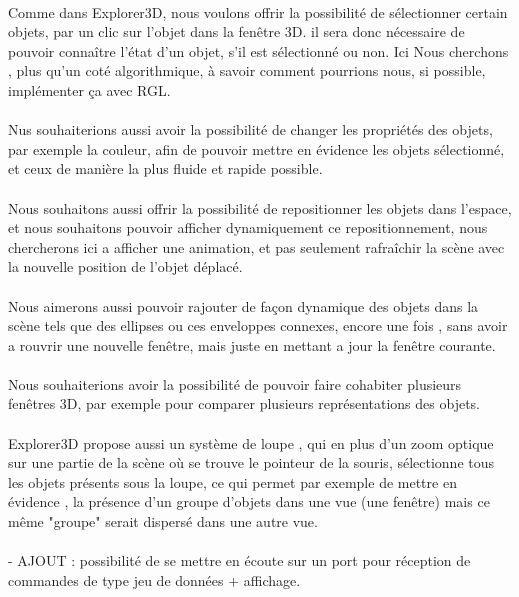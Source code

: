 \paragraph{}
Comme dans Explorer3D, nous voulons offrir la possibilité de sélectionner certain objets, par un clic sur l'objet dans la fenêtre 3D. il sera donc nécessaire de pouvoir connaître l'état d'un objet, s’il est sélectionné ou non. Ici Nous cherchons , plus qu'un coté algorithmique, à savoir comment pourrions nous, si possible, implémenter ça avec RGL.

\paragraph{}
Nus souhaiterions aussi avoir la possibilité de changer les propriétés des objets, par exemple la couleur, afin de pouvoir mettre en évidence les objets sélectionné, et ceux de manière la plus fluide et rapide possible.

\paragraph{}
Nous souhaitons aussi offrir la possibilité de repositionner les objets dans l'espace, et nous souhaitons pouvoir afficher dynamiquement ce repositionnement, nous chercherons ici a afficher une animation, et pas seulement rafraîchir la scène avec la nouvelle position de l'objet déplacé. 

\paragraph{}
Nous aimerons aussi pouvoir rajouter de façon dynamique des objets dans la scène tels que des ellipses ou ces enveloppes connexes, encore une fois , sans avoir a rouvrir une nouvelle fenêtre, mais juste en mettant a jour la fenêtre courante.

\paragraph{}
Nous souhaiterions avoir la possibilité de pouvoir faire cohabiter plusieurs fenêtres 3D,  par exemple pour comparer plusieurs représentations des objets.

\paragraph{}
Explorer3D propose aussi un système de loupe , qui en plus d'un zoom optique sur une partie de la scène où se trouve le pointeur de la souris, sélectionne tous les objets présents sous la loupe, ce qui permet par exemple de mettre en évidence , la présence d'un groupe d'objets dans une vue (une fenêtre) mais ce même "groupe" serait dispersé dans une autre vue.

\paragraph{}
- AJOUT : possibilité de se mettre en écoute sur un port pour réception de commandes de type jeu de données + affichage.

\newpage
